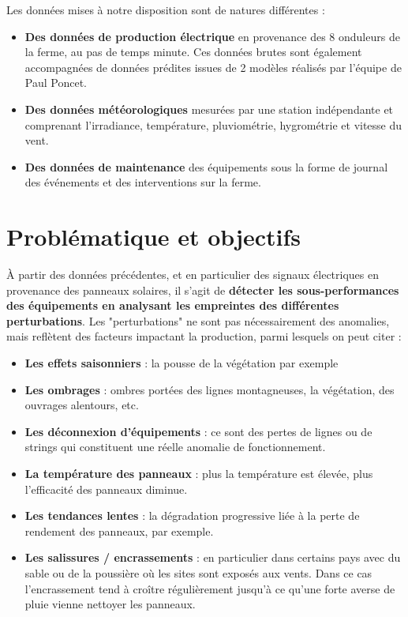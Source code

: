 Les données mises à notre disposition sont de natures différentes :
\begin{itemize}
\item \textbf{Des données de production électrique} en provenance des 8 onduleurs de la ferme, au pas de temps minute. Ces données brutes sont également accompagnées de données prédites issues de 2 modèles réalisés par l'équipe de Paul Poncet.
\item \textbf{Des données météorologiques} mesurées par une station indépendante et comprenant l'irradiance, température, pluviométrie, hygrométrie et vitesse du vent.
\item \textbf{Des données de maintenance} des équipements sous la forme de journal des événements et des interventions sur la ferme.
\end{itemize}
\paragraph{}
\paragraph{}
\paragraph{}
\section{Problématique et objectifs}
À partir des données précédentes, et en particulier des signaux électriques en provenance des panneaux solaires, il s’agit de \textbf{détecter les sous-performances des équipements en analysant les empreintes des différentes perturbations}.  Les "perturbations" ne sont pas nécessairement des anomalies, mais reflètent des facteurs impactant la production, parmi lesquels on peut citer :

\begin{itemize}
\item \textbf{Les effets saisonniers} : la pousse de la végétation par exemple
\item \textbf{Les ombrages} : ombres portées des lignes montagneuses, la végétation, des ouvrages alentours, etc.
\item \textbf{Les déconnexion d’équipements} : ce sont des pertes de lignes ou de strings qui constituent une réelle anomalie de fonctionnement.
\item \textbf{La température des panneaux} : plus la température est élevée, plus l'efficacité des panneaux diminue.
\item \textbf{Les tendances lentes} : la dégradation progressive liée à la perte de rendement des panneaux, par exemple.
\item \textbf{Les salissures / encrassements} : en particulier dans certains pays avec du sable ou de la poussière où les sites sont exposés aux vents. Dans ce cas l'encrassement tend à croître régulièrement jusqu'à ce qu'une forte averse de pluie vienne nettoyer les panneaux. \cite{JavedW}
\end{itemize}

